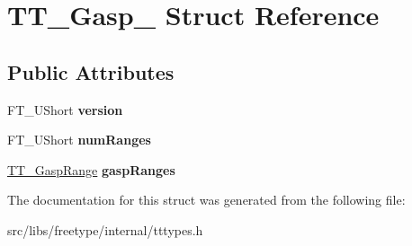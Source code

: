 \hypertarget{struct_t_t___gasp__}{
\section{TT\_\-Gasp\_\- Struct Reference}
\label{struct_t_t___gasp__}
}
\subsection*{Public Attributes}
\begin{DoxyCompactItemize}
\item 
\hypertarget{struct_t_t___gasp___a0166777999a11a32068418ed6cf0caf8}{
FT\_\-UShort {\bfseries version}}
\label{struct_t_t___gasp___a0166777999a11a32068418ed6cf0caf8}

\item 
\hypertarget{struct_t_t___gasp___a03f6dc693ebee0fedc055ac0981ee776}{
FT\_\-UShort {\bfseries numRanges}}
\label{struct_t_t___gasp___a03f6dc693ebee0fedc055ac0981ee776}

\item 
\hypertarget{struct_t_t___gasp___a50240e84cfd7fc79ae1f2996ecb2a5d1}{
\hyperlink{struct_t_t___gasp_range_rec__}{TT\_\-GaspRange} {\bfseries gaspRanges}}
\label{struct_t_t___gasp___a50240e84cfd7fc79ae1f2996ecb2a5d1}

\end{DoxyCompactItemize}


The documentation for this struct was generated from the following file:\begin{DoxyCompactItemize}
\item 
src/libs/freetype/internal/tttypes.h\end{DoxyCompactItemize}
